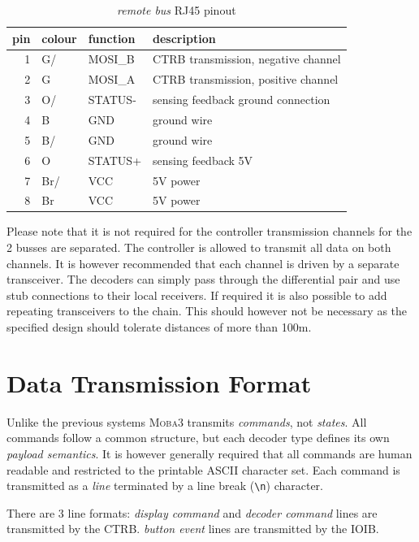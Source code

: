 \documentclass{scrreprt}
\begin{document}
\begin{table}[h!]
\centering
\begin{tabular}{ |r|l|l|l| }
\hline
pin & colour & function & description \\\hline\hline
  1 & G/     & MOSI\_B  & CTRB transmission, negative channel \\\hline
  2 & G      & MOSI\_A  & CTRB transmission, positive channel \\\hline
  3 & O/     & STATUS-  & sensing feedback ground connection \\\hline
  4 & B      & GND      & ground wire \\\hline
  5 & B/     & GND      & ground wire \\\hline
  6 & O      & STATUS+  & sensing feedback 5V \\\hline
  7 & Br/    & VCC      & 5V power \\\hline
  8 & Br     & VCC      & 5V power \\\hline
\end{tabular}
\caption{\emph{remote bus} RJ45 pinout}
\end{table}

Please note that it is not required for the controller transmission channels for the 2 busses are separated. The controller is allowed to transmit all data on both channels. It is however recommended that each channel is driven by a separate transceiver. The decoders can simply pass through the differential pair and use stub connections to their local receivers. If required it is also possible to add repeating transceivers to the chain. This should however not be necessary as the specified design should tolerate distances of more than 100m.

\section{Data Transmission Format}
Unlike the previous systems \textsc{Moba3} transmits \emph{commands}, not \emph{states}. All commands follow a common structure, but each decoder type defines its own \emph{payload semantics}. It is however generally required that all commands are human readable and restricted to the printable ASCII character set.
Each command is transmitted as a \emph{line} terminated by a line break (\texttt{\textbackslash{}n}) character.

There are 3 line formats:
\emph{display command} and \emph{decoder command} lines are transmitted by the CTRB.
\emph{button event} lines are transmitted by the IOIB.
\end{document}
